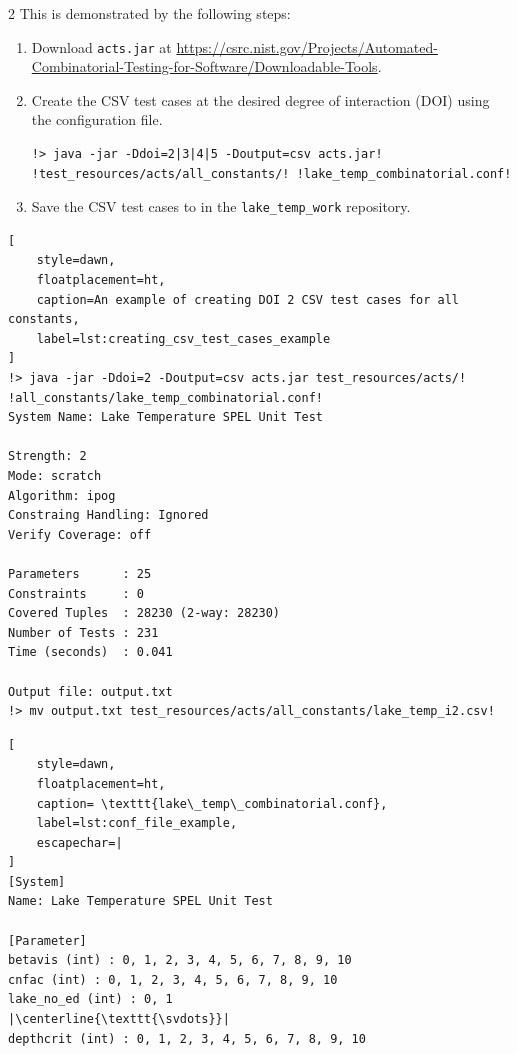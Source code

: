 \documentclass[10pt]{article}
\DeclareRobustCommand{\svdots}{%
  \vbox{
    \baselineskip=0.33333\normalbaselineskip
    \lineskiplimit=0pt
    \hbox{.}\hbox{.}\hbox{.}
    \kern-0.2\baselineskip
  }
}
\begin{document}
\begin{multicols}{2}
This is demonstrated by the following steps:
\begin{enumerate}
    \item Download \verb|acts.jar| at \url{https://csrc.nist.gov/Projects/Automated-Combinatorial-Testing-for-Software/Downloadable-Tools}.

    \item Create the CSV test cases at the desired degree of interaction (DOI) using the configuration file.
\begin{lstlisting}[style=dawn]
!> java -jar -Ddoi=2|3|4|5 -Doutput=csv acts.jar! !test_resources/acts/all_constants/! !lake_temp_combinatorial.conf!
\end{lstlisting}

    \item Save the CSV test cases to  in the \verb|lake_temp_work| repository.
\end{enumerate}

\begin{lstlisting}[
    style=dawn,
    floatplacement=ht,
    caption=An example of creating DOI 2 CSV test cases for all constants,
    label=lst:creating_csv_test_cases_example
]
!> java -jar -Ddoi=2 -Doutput=csv acts.jar test_resources/acts/! !all_constants/lake_temp_combinatorial.conf!
System Name: Lake Temperature SPEL Unit Test

Strength: 2
Mode: scratch
Algorithm: ipog
Constraing Handling: Ignored
Verify Coverage: off

Parameters      : 25
Constraints     : 0
Covered Tuples  : 28230 (2-way: 28230) 
Number of Tests : 231
Time (seconds)  : 0.041 

Output file: output.txt
!> mv output.txt test_resources/acts/all_constants/lake_temp_i2.csv!
\end{lstlisting}

\begin{lstlisting}[
    style=dawn,
    floatplacement=ht,
    caption= \texttt{lake\_temp\_combinatorial.conf},
    label=lst:conf_file_example,
    escapechar=|
]
[System]
Name: Lake Temperature SPEL Unit Test

[Parameter]
betavis (int) : 0, 1, 2, 3, 4, 5, 6, 7, 8, 9, 10
cnfac (int) : 0, 1, 2, 3, 4, 5, 6, 7, 8, 9, 10
lake_no_ed (int) : 0, 1
|\centerline{\texttt{\svdots}}|
depthcrit (int) : 0, 1, 2, 3, 4, 5, 6, 7, 8, 9, 10
\end{lstlisting}


\end{multicols}
\end{document}
